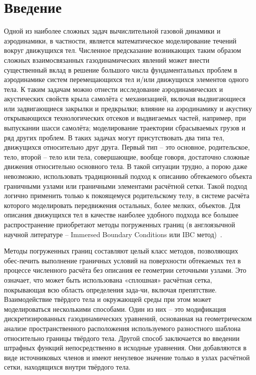 \chapter*{Введение}                         %
	Одной из наиболее сложных задач вычислительной газовой динамики и аэродинамики, в частности, является математическое моделирование течений вокруг движущихся тел. Численное предсказание возникающих таким образом сложных взаимосвязанных газодинамических явлений может внести существенный вклад в решение большого числа фундаментальных проблем в аэродинамике систем перемещающихся тел и/или движущихся элементов одного тела. К таким задачам можно отнести исследование аэродинамических и акустических свойств крыла самолёта с механизацией, включая выдвигающиеся или задвигающиеся закрылки и предкрылки; влияние на аэродинамику и акустику открывающихся технологических отсеков и выдвигаемых частей, например, при выпускании шасси самолёта; моделирование траектории сбрасываемых грузов и ряд других проблем. В таких задачах могут присутствовать два типа тел, движущихся относительно друг друга. Первый тип – это основное, родительское, тело, второй – тело или тела, совершающие, вообще говоря, достаточно сложные движения относительно основного тела. В такой ситуации трудно, а порою даже невозможно, использовать традиционный подход к описанию обтекаемого объекта граничными узлами или граничными элементами расчётной сетки. Такой подход логично применить только к покоящемуся родительскому телу, в системе расчёта которого моделировать передвижения остальных, более мелких, объектов. Для описания движущихся тел в качестве наиболее удобного подхода все большее распространение приобретают методы погруженных границ (в англоязычной научной литературе – Immersed Boundary Conditions или IBC метод)~\cite{mittal2005immersed, boiron2009high, brown2014characteristic}.

	Методы погруженных границ составляют целый класс методов, позволяющих обес-печить выполнение граничных условий на поверхности обтекаемых тел в процессе численного расчёта без описания ее геометрии сеточными узлами. Это означает, что может быть использована «сплошная» расчётная сетка, покрывающая всю область определения зада-чи, включая препятствие. Взаимодействие твёрдого тела и окружающей среды при этом может моделироваться несколькими способами. Один из них – это модификация дискретизированных газодинамических уравнений, основанная на геометрическом анализе пространственного расположения используемого разностного шаблона относительно границы твёрдого тела. Другой способ заключается во введении штрафных функций непосредственно в исходные уравнения. Они добавляются в виде источниковых членов и имеют ненулевое значение только в узлах расчётной сетки, находящихся внутри твёрдого тела.

